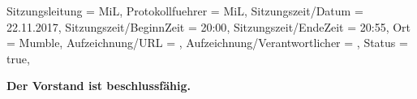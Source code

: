 \begin{Protokoll}{
        Sitzungsleitung                 = {MiL},             %
        Protokollfuehrer                = {MiL},              %
        Sitzungszeit/Datum              = {22.11.2017},       %
        Sitzungszeit/BeginnZeit         = {20:00},            %
        Sitzungszeit/EndeZeit           = {20:55},            %
        Ort                             = {Mumble},            %
        Aufzeichnung/URL                = {},                %
        Aufzeichnung/Verantwortlicher   = {},                  %
        Status                          = {true},            %
    }
    

    \begin{Anwesenheitsliste}
    \end{Anwesenheitsliste}
    
    \textbf{Der Vorstand ist beschlussfähig.}
    
    

\end{Protokoll}
